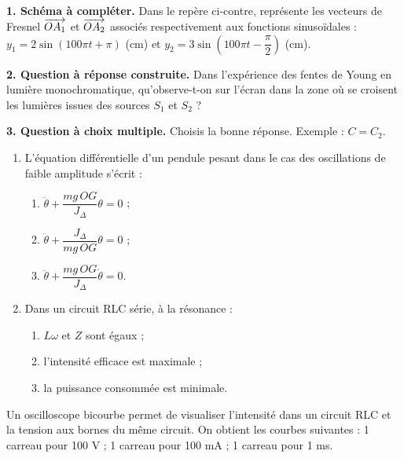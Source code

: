 \documentclass[11pt]{article}
\begin{document}
\noindent\textbf{1. Schéma à compléter.} Dans le repère ci-contre, représente les vecteurs de Fresnel $\overrightarrow{OA_1}$ et $\overrightarrow{OA_2}$ associés respectivement aux fonctions sinusoïdales : $y_1 = 2\sin(100\pi t + \pi)$ (cm) et $y_2 = 3\sin\!\left(100\pi t - \dfrac{\pi}{2}\right)$ (cm).

\begin{center}
\end{center}

\medskip
\noindent\textbf{2. Question à réponse construite.} Dans l'expérience des fentes de Young en lumière monochromatique, qu'observe-t-on sur l'écran dans la zone où se croisent les lumières issues des sources $S_1$ et $S_2$ ?

\medskip
\noindent\textbf{3. Question à choix multiple.} Choisis la bonne réponse. Exemple : $C = C_2$.
\begin{enumerate}[label=\alph*.]
  \item L'équation différentielle d'un pendule pesant dans le cas des oscillations de faible amplitude s'écrit :
  \begin{enumerate}[label=a.\arabic*.]
    \item $\ddot{\theta} + \dfrac{mg\,OG}{J_\Delta}\theta = 0$ ;
    \item $\ddot{\theta} + \dfrac{J_\Delta}{mg\,OG}\theta = 0$ ;
    \item $\ddot{\theta} + \dfrac{mg\,OG}{J_\Delta}\dot{\theta} = 0$.
  \end{enumerate}
  \item Dans un circuit RLC série, à la résonance :
  \begin{enumerate}[label=b.\arabic*.]
    \item $L\omega$ et $Z$ sont égaux ;
    \item l'intensité efficace est maximale ;
    \item la puissance consommée est minimale.
  \end{enumerate}
\end{enumerate}

Un oscilloscope bicourbe permet de visualiser l'intensité dans un circuit RLC et la tension aux bornes du même circuit. On obtient les courbes suivantes : 1 carreau pour 100 V ; 1 carreau pour 100 mA ; 1 carreau pour 1 ms.
\end{document}
